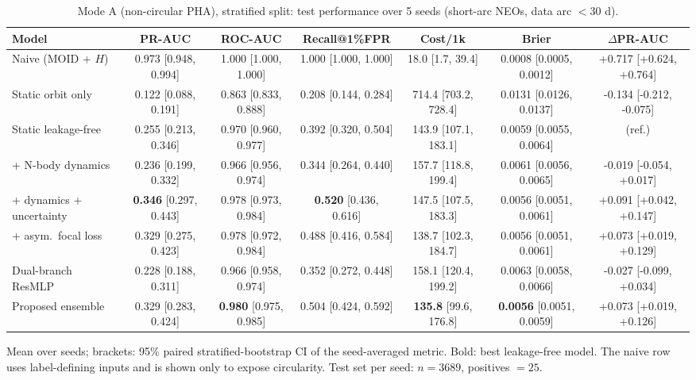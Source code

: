\begin{table}[t]
\centering
\small
\caption{Mode A (non-circular PHA), stratified split: test performance over 5 seeds (short-arc NEOs, data arc $<30$ d).}
\label{tab:pha_stratified_short_arc}
\begin{tabular}{lcccccc}
\toprule
Model & PR-AUC & ROC-AUC & Recall@1\%FPR & Cost/1k & Brier & $\Delta$PR-AUC \\
\midrule
Naive (MOID + $H$) & 0.973 \scriptsize{[0.948, 0.994]} & 1.000 \scriptsize{[1.000, 1.000]} & 1.000 \scriptsize{[1.000, 1.000]} & 18.0 \scriptsize{[1.7, 39.4]} & 0.0008 \scriptsize{[0.0005, 0.0012]} & +0.717 \scriptsize{[+0.624, +0.764]} \\
\midrule
Static orbit only & 0.122 \scriptsize{[0.088, 0.191]} & 0.863 \scriptsize{[0.833, 0.888]} & 0.208 \scriptsize{[0.144, 0.284]} & 714.4 \scriptsize{[703.2, 728.4]} & 0.0131 \scriptsize{[0.0126, 0.0137]} & -0.134 \scriptsize{[-0.212, -0.075]} \\
Static leakage-free & 0.255 \scriptsize{[0.213, 0.346]} & 0.970 \scriptsize{[0.960, 0.977]} & 0.392 \scriptsize{[0.320, 0.504]} & 143.9 \scriptsize{[107.1, 183.1]} & 0.0059 \scriptsize{[0.0055, 0.0064]} & (ref.) \\
+ N-body dynamics & 0.236 \scriptsize{[0.199, 0.332]} & 0.966 \scriptsize{[0.956, 0.974]} & 0.344 \scriptsize{[0.264, 0.440]} & 157.7 \scriptsize{[118.8, 199.4]} & 0.0061 \scriptsize{[0.0056, 0.0065]} & -0.019 \scriptsize{[-0.054, +0.017]} \\
+ dynamics + uncertainty & \textbf{0.346} \scriptsize{[0.297, 0.443]} & 0.978 \scriptsize{[0.973, 0.984]} & \textbf{0.520} \scriptsize{[0.436, 0.616]} & 147.5 \scriptsize{[107.5, 183.3]} & 0.0056 \scriptsize{[0.0051, 0.0061]} & +0.091 \scriptsize{[+0.042, +0.147]} \\
+ asym.\ focal loss & 0.329 \scriptsize{[0.275, 0.423]} & 0.978 \scriptsize{[0.972, 0.984]} & 0.488 \scriptsize{[0.416, 0.584]} & 138.7 \scriptsize{[102.3, 184.7]} & 0.0056 \scriptsize{[0.0051, 0.0061]} & +0.073 \scriptsize{[+0.019, +0.129]} \\
Dual-branch ResMLP & 0.228 \scriptsize{[0.188, 0.311]} & 0.966 \scriptsize{[0.958, 0.974]} & 0.352 \scriptsize{[0.272, 0.448]} & 158.1 \scriptsize{[120.4, 199.2]} & 0.0063 \scriptsize{[0.0058, 0.0066]} & -0.027 \scriptsize{[-0.099, +0.034]} \\
Proposed ensemble & 0.329 \scriptsize{[0.283, 0.424]} & \textbf{0.980} \scriptsize{[0.975, 0.985]} & 0.504 \scriptsize{[0.424, 0.592]} & \textbf{135.8} \scriptsize{[99.6, 176.8]} & \textbf{0.0056} \scriptsize{[0.0051, 0.0059]} & +0.073 \scriptsize{[+0.019, +0.126]} \\
\bottomrule
\end{tabular}
\par\vspace{2pt}\footnotesize Mean over seeds; brackets: 95\% paired stratified-bootstrap CI of the seed-averaged metric. Bold: best leakage-free model. The naive row uses label-defining inputs and is shown only to expose circularity. Test set per seed: $n=3689$, positives $=25$.
\end{table}
